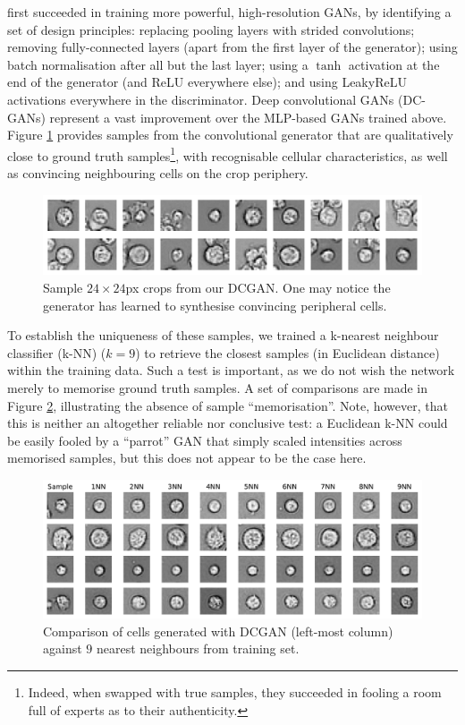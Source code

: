 \cite{radford2015unsupervised} first succeeded in training more powerful, high-resolution GANs, by identifying a set of design principles: replacing pooling layers with strided convolutions; removing fully-connected layers (apart from the first layer of the generator); using batch normalisation after all but the last layer; using a $\tanh$ activation at the end of the generator (and ReLU everywhere else); and using LeakyReLU activations everywhere in the discriminator. Deep convolutional GANs (DC-GANs) represent a vast improvement over the MLP-based GANs trained above. Figure \ref{fig:dcgan_samples} provides samples from the convolutional generator that are qualitatively close to ground truth samples\footnote{Indeed, when swapped with true samples, they succeeded in fooling a room full of experts as to their authenticity.}, with recognisable cellular characteristics, as well as convincing neighbouring cells on the crop periphery.

\begin{figure}[h!]
\centering
\includegraphics[width=\textwidth]{img/feasibility_dcgan_samples.pdf}
\caption{Sample $24\times 24$px crops from our DCGAN. One may notice the generator has learned to synthesise convincing peripheral cells.}
\label{fig:dcgan_samples}
\end{figure}

To establish the uniqueness of these samples, we trained a k-nearest neighbour classifier (k-NN) ($k=9$) to retrieve the closest samples (in Euclidean distance) within the training data. Such a test is important, as we do not wish the network merely to memorise ground truth samples. A set of comparisons are made in Figure \ref{fig:knn_gan}, illustrating the absence of sample ``memorisation''. Note, however, that this is neither an altogether reliable nor conclusive test: a Euclidean k-NN could be easily fooled by a ``parrot'' GAN that simply scaled intensities across memorised samples, but this does not appear to be the case here.

\begin{figure}[h!]
\centering
\includegraphics[width=\textwidth]{img/feasibility_knn_gan.pdf}
\caption{Comparison of cells generated with DCGAN (left-most column) against $9$ nearest neighbours from training set.}
\label{fig:knn_gan}
\end{figure}

